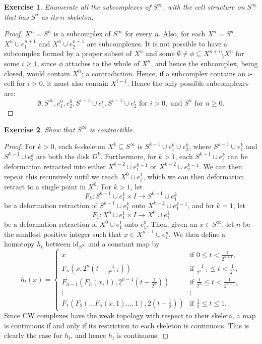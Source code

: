 \documentclass{article}
\newtheorem{exercise}{Exercise}[subsection]
\begin{document}
\begin{exercise}
Enumerate all the subcomplexes of $S^\infty$, with the cell structure on $S^\infty$ that has $S^n$ as its $n$-skeleton.
\end{exercise}
\begin{proof}
$X^n=S^n$ is a subcomplex of $S^\infty$ for every $n$. Also, for each $X^n=S^n$, $X^n\cup e_{1}^{n+1}$ and $X^n\cup e_{2}^{n+1}$ are subcomplexes. It is not possible to have a subcomplex formed by a proper subset of $X^n$ and some $\emptyset\neq\phi\subseteq X^{n+i}\setminus X^n$ for some $i\geq 1$, since $\phi$ attaches to the whole of $X^n$, and hence the subcomplex, being closed, would contain $X^n$; a contradiction. Hence, if a subcomplex contains an $i$-cell for $i>0$, it must also contain $X^{i-1}$. Hence the only possible subcomplexes are:
\[\emptyset, S^\infty, e_1^0,e_2^0, S^{i-1}\cup e_1^i,S^{i-1}\cup e_2^i \text{ for } i>0,\text{ and } S^n\text{ for }n\geq 0.\]
\end{proof}

\begin{exercise}
Show that $S^\infty$ is contractible.
\end{exercise}
\begin{proof}
For $k>0$, each $k$-skeleton $X^k\subseteq S^\infty$ is $S^{k-1}\cup e_1^k\cup e_2^k$, where $S^{k-1}\cup e_1^k$ and $S^{k-1}\cup e_2^k$ are both the disk $D^k$. Furthermore, for $k>1$, each $S^{k-1}\cup e_i^k$ can be deformation retracted into either $X^{k-2}\cup e_1^{k-1}$ or $X^{k-2}\cup e_2^{k-1}$. We can then repeat this recursively until we reach $X^0\cup e_i^{1}$, which we can then deformation retract to a single point in $X^0$. For $k>1$, let \[F_k:S^{k-1}\cup e_1^k\times I\to S^{k-1}\cup e_1^k\] be a deformation retraction of $S^{k-1}\cup e_1^k$ onto $X^{k-2}\cup e_1^{k-1}$, and for $k=1$, let \[F_1:X^0\cup e_1^1\times I\to X^0\cup e_1^1\] be a deformation retraction of $X^0\cup e_1^1$ onto $e_1^0$. Then, given an $x\in S^\infty$, let $n$ be the smallest positive integer such that $x\in X^{n-1}\cup e_1^n$. We then define a homotopy $h_t$ between $\text{id}_{S^\infty}$ and a constant map by\[h_t(x)=\begin{cases}
    x&\text{if }0\leq t<\frac{1}{2^{n+1}},\\F_n(x,2^n(t-\frac{1}{2^{n+1}}))&\text{if }\frac{1}{2^{n+1}}\leq t<\frac{1}{2^n},\\F_{n-1}(F_n(x,1),2^{n-1}(t-\frac{1}{2^{n}}))&\text{if }\frac{1}{2^n}\leq t<\frac{1}{2^{n-1}},\\\vdots&\vdots\\F_1(F_2(...F_n(x,1)...,1),2(t-\frac{1}{2}))&\text{if }\frac{1}{2}\leq t\leq 1.
\end{cases}\]Since CW complexes have the weak topology with respect to their skeleta, a map is continuous if and only if its restriction to each skeleton is continuous. This is clearly the case for $h_t$, and hence $h_t$ is continuous.
\end{proof}
\end{document}
